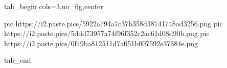  
 
 
 
 


\ifcmt
  tab_begin cols=3,no_fig,center

     pic https://i2.paste.pics/5922a794a7c37b358d38741748ad3256.png
		 pic https://i2.paste.pics/5ddd73957a74f96f352c2ac61d08d90b.png
		 pic https://i2.paste.pics/0f49ba812511d7a051b007592e37384e.png

  tab_end
\fi
